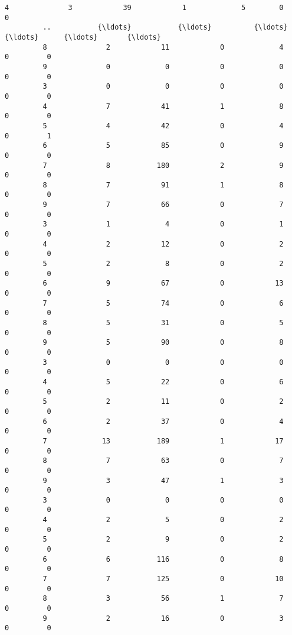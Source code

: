 \documentclass[11pt]{article}
\begin{document}
\begin{Verbatim}[commandchars=\\\{\}]
         4              3            39            1             5        0         0   
         ..           {\ldots}           {\ldots}          {\ldots}           {\ldots}      {\ldots}       {\ldots}   
         8              2            11            0             4        0         0   
         9              0             0            0             0        0         0   
         3              0             0            0             0        0         0   
         4              7            41            1             8        0         0   
         5              4            42            0             4        0         1   
         6              5            85            0             9        0         0   
         7              8           180            2             9        0         0   
         8              7            91            1             8        0         0   
         9              7            66            0             7        0         0   
         3              1             4            0             1        0         0   
         4              2            12            0             2        0         0   
         5              2             8            0             2        0         0   
         6              9            67            0            13        0         0   
         7              5            74            0             6        0         0   
         8              5            31            0             5        0         0   
         9              5            90            0             8        0         0   
         3              0             0            0             0        0         0   
         4              5            22            0             6        0         0   
         5              2            11            0             2        0         0   
         6              2            37            0             4        0         0   
         7             13           189            1            17        0         0   
         8              7            63            0             7        0         0   
         9              3            47            1             3        0         0   
         3              0             0            0             0        0         0   
         4              2             5            0             2        0         0   
         5              2             9            0             2        0         0   
         6              6           116            0             8        0         0   
         7              7           125            0            10        0         0   
         8              3            56            1             7        0         0   
         9              2            16            0             3        0         0   
         

\end{Verbatim}
\end{document}
